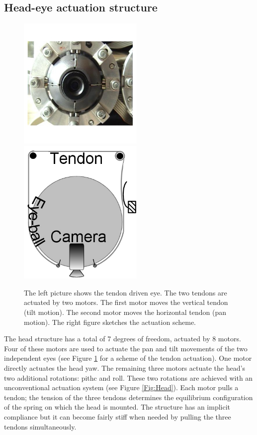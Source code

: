 \subsection{Head-eye actuation structure}

\begin{figure}[h!tbp]
  \centering
  \includegraphics[width=60mm]{Figure/EyePhoto.jpg}
  \includegraphics[width=60mm]{Figure/EyeSection.jpg}\\
  \caption{The left picture shows the tendon driven eye. The
 two tendons are actuated by two motors. The first motor moves the vertical
  tendon (tilt motion). The second motor moves the horizontal tendon (pan motion). The
  right figure sketches the actuation scheme.}\label{Fig:EyeSection}
\end{figure}

The head structure has a total of 7 degrees of freedom, actuated by 8 motors. Four of these motors are used to actuate the pan and tilt movements of the two independent eyes (see Figure \ref{Fig:EyeSection} for a scheme of the tendon actuation). One motor directly actuates the head yaw. The remaining three motors actuate the head's two additional rotations: pithc and roll. These two rotations are achieved with an unconventional actuation system (see Figure \ref{Fig:Head}). Each motor pulls a tendon; the tension of the three tendons determines the equilibrium configuration of the spring on which the head is mounted. The structure has an implicit compliance but it can become fairly stiff when needed by pulling the three tendons simultaneously.

